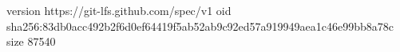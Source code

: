 version https://git-lfs.github.com/spec/v1
oid sha256:83db0acc492b2f6d0ef64419f5ab52ab9c92ed57a919949aea1c46e99bb8a78c
size 87540
